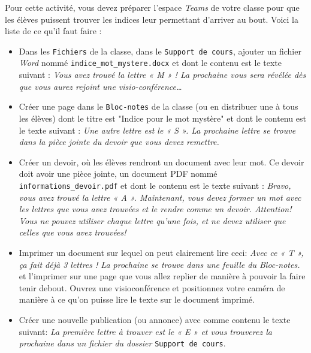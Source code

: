 Pour cette activité, vous devez préparer l’espace \emph{Teams} de votre classe pour que les élèves puissent trouver les indices leur permettant d’arriver au bout. Voici la liste de ce qu’il faut faire :
\begin{itemize}
\item Dans les \texttt{Fichiers} de la classe, dans le \texttt{Support de cours}, ajouter un fichier \emph{Word} nommé \texttt{indice\_mot\_mystere.docx} et dont le contenu est le texte suivant : \emph{Vous avez trouvé la lettre « M » ! La prochaine vous sera révélée dès que vous aurez rejoint une visio-conférence…}

\item Créer une page dans le \texttt{Bloc-notes} de la classe (ou en distribuer une à tous les élèves) dont le titre est "Indice pour le mot mystère" et dont le contenu est le texte suivant : \emph{Une autre lettre est le « S ». La prochaine lettre se trouve dans la pièce jointe du devoir que vous devez remettre.}

\item Créer un devoir, où les élèves rendront un document avec leur mot. Ce devoir doit avoir une pièce jointe, un document PDF nommé \texttt{informations\_devoir.pdf} et dont le contenu est le texte suivant : \emph{Bravo, vous avez trouvé la lettre « A ». Maintenant, vous devez former un mot avec les lettres que vous avez trouvées et le rendre comme un devoir. Attention! Vous ne pouvez utiliser chaque lettre qu'une fois, et ne devez utiliser que celles que vous avez trouvées!}

\item Imprimer un document sur lequel on peut clairement lire ceci: \emph{Avec ce « T », ça fait déjà 3 lettres ! La prochaine se trouve dans une feuille du Bloc-notes.} et l'imprimer sur une page que vous allez replier de manière à pouvoir la faire tenir debout. Ouvrez une visioconférence et positionnez votre caméra de manière à ce qu'on puisse lire le texte sur le document imprimé.

\item Créer une nouvelle publication (ou annonce) avec comme contenu le texte suivant: \emph{La première lettre à trouver est le « E » et vous trouverez la prochaine dans un fichier du dossier} \texttt{Support de cours}.
\end{itemize}




